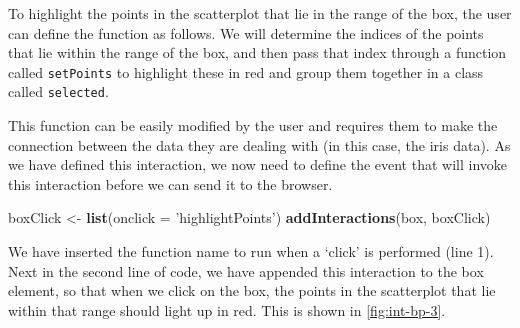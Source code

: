 \documentclass[11pt,]{report}
\newenvironment{Shaded}{\begin{snugshade}}{\end{snugshade}}
\newcommand{\KeywordTok}[1]{\textcolor[rgb]{0.13,0.29,0.53}{\textbf{#1}}}
\newcommand{\DataTypeTok}[1]{\textcolor[rgb]{0.13,0.29,0.53}{#1}}
\newcommand{\StringTok}[1]{\textcolor[rgb]{0.31,0.60,0.02}{#1}}
\newcommand{\CommentTok}[1]{\textcolor[rgb]{0.56,0.35,0.01}{\textit{#1}}}
\newcommand{\ControlFlowTok}[1]{\textcolor[rgb]{0.13,0.29,0.53}{\textbf{#1}}}
\newcommand{\OperatorTok}[1]{\textcolor[rgb]{0.81,0.36,0.00}{\textbf{#1}}}
\newcommand{\NormalTok}[1]{#1}
\begin{document}
To highlight the points in the scatterplot that lie in the range of the
box, the user can define the function as follows. We will determine the
indices of the points that lie within the range of the box, and then
pass that index through a function called \texttt{setPoints} to
highlight these in red and group them together in a class called
\texttt{selected}.

\begin{Shaded}
\end{Shaded}

This function can be easily modified by the user and requires them to
make the connection between the data they are dealing with (in this
case, the iris data). As we have defined this interaction, we now need
to define the event that will invoke this interaction before we can send
it to the browser.

\begin{Shaded}
\begin{Highlighting}[]
\NormalTok{boxClick <-}\StringTok{ }\KeywordTok{list}\NormalTok{(}\DataTypeTok{onclick =} \StringTok{'highlightPoints'}\NormalTok{)}
\KeywordTok{addInteractions}\NormalTok{(box, boxClick)}
\end{Highlighting}
\end{Shaded}

We have inserted the function name to run when a `click' is performed
(line 1). Next in the second line of code, we have appended this
interaction to the box element, so that when we click on the box, the
points in the scatterplot that lie within that range should light up in
red. This is shown in \autoref{fig:int-bp-3}.
\end{document}

